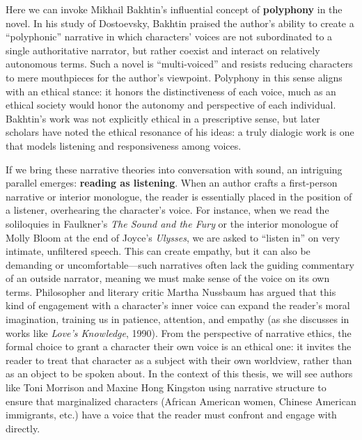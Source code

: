\documentclass[12pt]{report}
\begin{document}
Here we can invoke Mikhail Bakhtin’s influential concept of \textbf{polyphony} in the novel. In his study of Dostoevsky, Bakhtin praised the author’s ability to create a “polyphonic” narrative in which characters’ voices are not subordinated to a single authoritative narrator, but rather coexist and interact on relatively autonomous terms. Such a novel is “multi-voiced” and resists reducing characters to mere mouthpieces for the author’s viewpoint. Polyphony in this sense aligns with an ethical stance: it honors the distinctiveness of each voice, much as an ethical society would honor the autonomy and perspective of each individual. Bakhtin’s work was not explicitly ethical in a prescriptive sense, but later scholars have noted the ethical resonance of his ideas: a truly dialogic work is one that models listening and responsiveness among voices.

If we bring these narrative theories into conversation with sound, an intriguing parallel emerges: \textbf{reading as listening}. When an author crafts a first-person narrative or interior monologue, the reader is essentially placed in the position of a listener, overhearing the character’s voice. For instance, when we read the soliloquies in Faulkner’s \textit{The Sound and the Fury} or the interior monologue of Molly Bloom at the end of Joyce’s \textit{Ulysses}, we are asked to “listen in” on very intimate, unfiltered speech. This can create empathy, but it can also be demanding or uncomfortable—such narratives often lack the guiding commentary of an outside narrator, meaning we must make sense of the voice on its own terms. Philosopher and literary critic Martha Nussbaum has argued that this kind of engagement with a character’s inner voice can expand the reader’s moral imagination, training us in patience, attention, and empathy (as she discusses in works like \textit{Love’s Knowledge}, 1990). From the perspective of narrative ethics, the formal choice to grant a character their own voice is an ethical one: it invites the reader to treat that character as a subject with their own worldview, rather than as an object to be spoken about. In the context of this thesis, we will see authors like Toni Morrison and Maxine Hong Kingston using narrative structure to ensure that marginalized characters (African American women, Chinese American immigrants, etc.) have a voice that the reader must confront and engage with directly.
\end{document}
